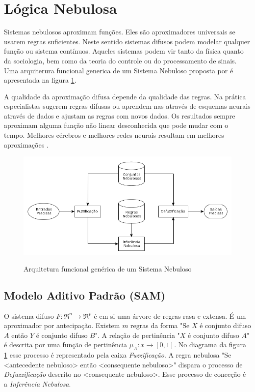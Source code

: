 \section{Lógica Nebulosa}

Sistemas nebulosos aproximam funções. Eles são aproximadores universais se usarem regras suficientes. 
Neste sentido sistemas difusos podem modelar qualquer função ou sistema contínuos. Aqueles sistemas 
podem vir tanto da física quanto da sociologia, bem como da teoria do controle ou do 
processamento de sinais. Uma arquiterura funcional generica de um Sistema Nebuloso proposta por
\cite{passos2005datamining} é apresentada na figura \ref{arq_fuzzy}.

A qualidade da aproximação difusa depende da qualidade das regras. Na prática especialistas sugerem regras
difusas ou aprendem-nas através de esquemas neurais através de dados e ajustam as regras com novos dados.
Os resultados sempre aproximam alguma função não linear desconhecida que pode mudar com o tempo. Melhores 
cérebros e melhores redes neurais resultam em melhores aproximações \cite{kosko1997fuzzy}.

\begin{figure}
  \includegraphics[width=15cm]{imgs/arquitetura_fuzzy}\label{arq_fuzzy}
  \caption{Arquitetura funcional genérica de um Sistema Nebuloso \cite{passos2005datamining}}
\end{figure}

\subsection{Modelo Aditivo Padrão (SAM)}

O sistema difuso $F:\Re^n \rightarrow \Re^p$ é em si uma árvore de regras rasa e extensa. É um aproximador
por antecipação. Existem $m$ regras da forma "Se $X$ é conjunto difuso $A$ então $Y$ é conjunto difuso $B$".
A relação de pertinência "$X$ é conjunto difuso $A$" é descrita por uma função de pertinência
$\mu_A: x \longrightarrow [0,1]$. No diagrama da figura \ref{arq_fuzzy} esse processo é representado pela
caixa \emph{Fuzzificação}. A regra nebulosa "Se <antecedente nebuloso> então <consequente nebuloso>" dispara
o processo de \emph{Defuzzificação} descrito no <consequente nebuloso>. Esse processo de conecção é a
\emph{Inferência Nebulosa}.

